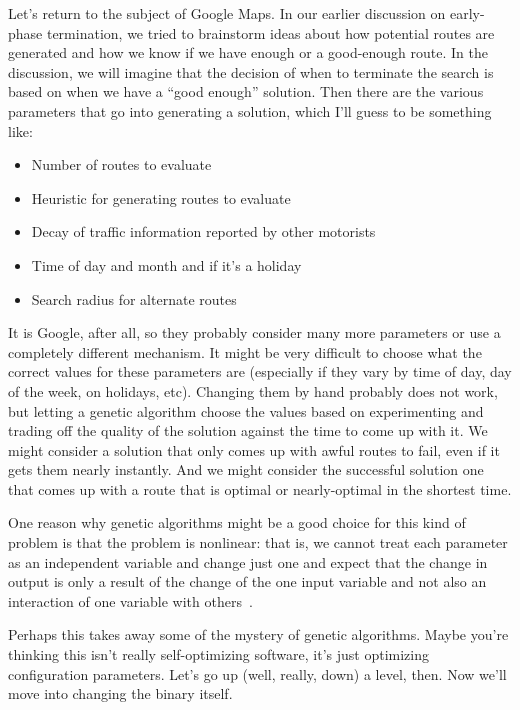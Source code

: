 \documentclass[a4paper]{report}
\begin{document}
Let's return to the subject of Google Maps. In our earlier discussion on early-phase termination, we tried to brainstorm ideas about how potential routes are generated and how we know if we have enough or a good-enough route. In the discussion, we will imagine that the decision of when to terminate the search is based on when we have a ``good enough'' solution. Then there are the various parameters that go into generating a solution, which I'll guess to be something like:

\begin{itemize}
	\item Number of routes to evaluate
	\item Heuristic for generating routes to evaluate
	\item Decay of traffic information reported by other motorists
	\item Time of day and month and if it's a holiday
	\item Search radius for alternate routes
\end{itemize}

It is Google, after all, so they probably consider many more parameters or use a completely different mechanism. It might be very difficult to choose what the correct values for these parameters are (especially if they vary by time of day, day of the week, on holidays, etc). Changing them by hand probably does not work, but letting a genetic algorithm choose the values based on experimenting and trading off the quality of the solution against the time to come up with it. We might consider a solution that only comes up with awful routes to fail, even if it gets them nearly instantly. And we might consider the successful solution one that comes up with a route that is optimal or nearly-optimal in the shortest time.

One reason why genetic algorithms might be a good choice for this kind of problem is that the problem is nonlinear: that is, we cannot treat each parameter as an independent variable and change just one and expect that the change in output is only a result of the change of the one input variable and not also an interaction of one variable with others~\cite{genetic}.

Perhaps this takes away some of the mystery of genetic algorithms. Maybe you're thinking this isn't really self-optimizing software, it's just optimizing configuration parameters. Let's go up (well, really, down) a level, then. Now we'll move into changing the binary itself.
\end{document}
